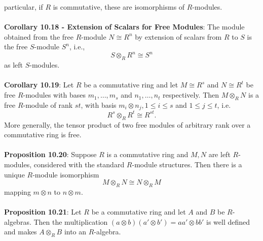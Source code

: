 \documentclass{article}
\begin{document}
particular, if $R$ is commutative, these are isomorphisms of $R$-modules. \\ \\
\textbf{Corollary 10.18 - Extension of Scalars for Free Modules}: The module obtained from the free $R$-module $N \cong R^n$ by extension of scalars from $R$ to $S$ is the free $S$-module $S^n$, i.e., $$S \otimes_R R^n \cong S^n$$ as left $S$-modules. \\ \\
\textbf{Corollary 10.19}: Let $R$ be a commutative ring and let $M \cong R^s$ and $N \cong R^t$ be  free $R$-modules with bases $m_1, \dots, m_s$ and $n_1, \dots, n_t$ respectively. Then $M \otimes_R N$ is a free $R$-module of rank $st$, with basis $m_i \otimes n_j, 1 \leq i \leq s$ and $1 \leq j \leq t$, i.e. $$R^s \otimes_R R^t \cong R^{st}.$$ More generally, the tensor product of two free modules of arbitrary rank over
a commutative ring is free. \\ \\
\textbf{Proposition 10.20}: Suppose $R$ is a commutative ring and $M, N$ are left $R$-modules, considered with the standard $R$-module structures. Then there is a unique $R$-module isomorphism $$M \otimes_R N \cong N \otimes_R M$$ mapping $m \otimes n$ to $n \otimes m$. \\ \\
\textbf{Proposition 10.21}: Let $R$ be a commutative ring and let $A$ and $B$ be $R$-algebras. Then the multiplication $(a \otimes b)(a' \otimes b') = aa' \otimes bb'$ is well defined and makes $A \otimes_R B$ into an $R$-algebra. \\ \\
\end{document}
